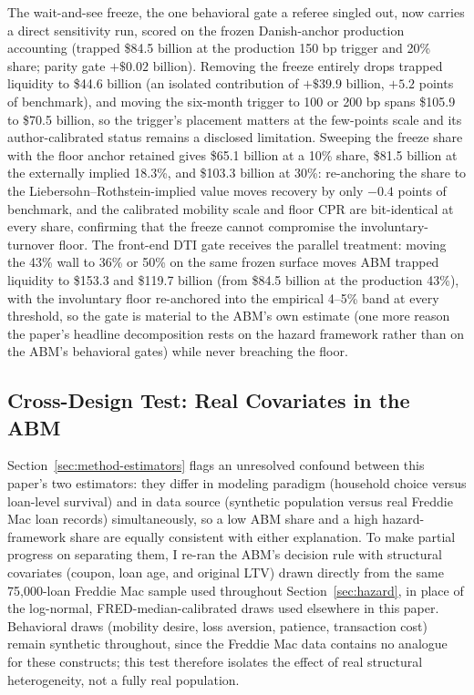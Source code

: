 \documentclass[12pt]{article}
\begin{document}
The wait-and-see freeze, the one behavioral gate a referee singled out, now carries a direct sensitivity run, scored on the frozen Danish-anchor production accounting (trapped \$84.5 billion at the production 150 bp trigger and 20\% share; parity gate $+\$0.02$ billion). Removing the freeze entirely drops trapped liquidity to \$44.6 billion (an isolated contribution of $+\$39.9$ billion, $+5.2$ points of benchmark), and moving the six-month trigger to 100 or 200 bp spans \$105.9 to \$70.5 billion, so the trigger's placement matters at the few-points scale and its author-calibrated status remains a disclosed limitation. Sweeping the freeze share with the floor anchor retained gives \$65.1 billion at a 10\% share, \$81.5 billion at the externally implied 18.3\%, and \$103.3 billion at 30\%: re-anchoring the share to the Liebersohn--Rothstein-implied value moves recovery by only $-0.4$ points of benchmark, and the calibrated mobility scale and floor CPR are bit-identical at every share, confirming that the freeze cannot compromise the involuntary-turnover floor. The front-end DTI gate receives the parallel treatment: moving the 43\% wall to 36\% or 50\% on the same frozen surface moves ABM trapped liquidity to \$153.3 and \$119.7 billion (from \$84.5 billion at the production 43\%), with the involuntary floor re-anchored into the empirical 4--5\% band at every threshold, so the gate is material to the ABM's own estimate (one more reason the paper's headline decomposition rests on the hazard framework rather than on the ABM's behavioral gates) while never breaching the floor.

\subsection{Cross-Design Test: Real Covariates in the ABM}\label{sec:robustness-crossdesign}

Section~\ref{sec:method-estimators} flags an unresolved confound between this paper's two estimators: they differ in modeling paradigm (household choice versus loan-level survival) and in data source (synthetic population versus real Freddie Mac loan records) simultaneously, so a low ABM share and a high hazard-framework share are equally consistent with either explanation. To make partial progress on separating them, I re-ran the ABM's decision rule with structural covariates (coupon, loan age, and original LTV) drawn directly from the same 75,000-loan Freddie Mac sample used throughout Section~\ref{sec:hazard}, in place of the log-normal, FRED-median-calibrated draws used elsewhere in this paper. Behavioral draws (mobility desire, loss aversion, patience, transaction cost) remain synthetic throughout, since the Freddie Mac data contains no analogue for these constructs; this test therefore isolates the effect of real structural heterogeneity, not a fully real population.
\end{document}
